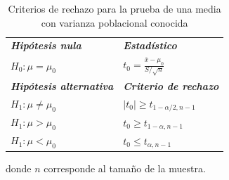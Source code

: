 \documentclass[
]{book}
\newcommand{\gt}{>}
\newcommand{\lt}{<}
\theoremstyle{definition}
\theoremstyle{definition}
\theoremstyle{definition}
\theoremstyle{definition}
\theoremstyle{remark}
\begin{document}
\begin{table}[H]

\caption{\label{tab:unamedia2}Criterios de rechazo para la prueba de una media con varianza poblacional conocida}
\centering
\begin{tabular}[t]{ll}
\toprule
\em{\textbf{Hipótesis nula}} & \em{\textbf{Estadístico}}\\
$H_0: \mu = \mu_0$ & $t_0 = \displaystyle\frac{\bar{x}-\mu_0}{S/\sqrt{n}}$\\
\em{\textbf{Hipótesis alternativa}} & \em{\textbf{Criterio de rechazo}}\\
$H_1: \mu \neq \mu_0$ & $|t_0| \geq t_{1-\alpha/2, n-1}$\\
$H_1: \mu \gt \mu_0$ & $t_0 \geq t_{1-\alpha,n-1}$\\
\addlinespace
$H_1: \mu \lt \mu_0$ & $t_0 \leq t_{\alpha,n-1}$\\
\bottomrule
\end{tabular}
\end{table}

donde \(n\) corresponde al tamaño de la muestra.
\end{document}
